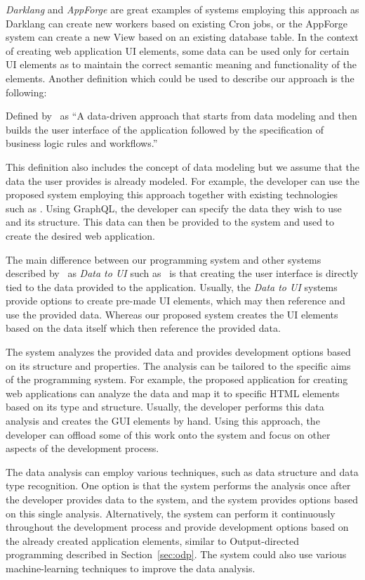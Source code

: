 \emph{Darklang} and \emph{AppForge} are great examples of systems employing this approach as Darklang can create new workers based on existing Cron jobs, or the AppForge system can create a new View based on an existing database table.
In the context of creating web application UI elements, some data can be used only for certain UI elements as to maintain the correct semantic meaning and functionality of the elements.
Another definition which could be used to describe our approach is the following:

\begin{defn}[Data to UI]
	Defined by~\citet{Sahay_Indamutsa_Di} as ``A data-driven approach that starts from data modeling and then builds the user interface of the application followed by the specification of business logic rules and workflows.''
\end{defn}

This definition also includes the concept of data modeling but we assume that the data the user provides is already modeled.
For example, the developer can use the proposed system employing this approach together with existing technologies such as \citet{graphql}.
Using GraphQL, the developer can specify the data they wish to use and its structure.
This data can then be provided to the system and used to create the desired web application.

The main difference between our programming system and other systems described by~\citet{Sahay_Indamutsa_Di} as \emph{Data to UI} such as~\citet{mendix} is that creating the user interface is directly tied to the data provided to the application.
Usually, the \emph{Data to UI} systems provide options to create pre-made UI elements, which may then reference and use the provided data.
Whereas our proposed system creates the UI elements based on the data itself which then reference the provided data.

The system analyzes the provided data and provides development options based on its structure and properties.
The analysis can be tailored to the specific aims of the programming system.
For example, the proposed application for creating web applications can analyze the data and map it to specific HTML elements based on its type and structure.
Usually, the developer performs this data analysis and creates the GUI elements by hand.
Using this approach, the developer can offload some of this work onto the system and focus on other aspects of the development process.

The data analysis can employ various techniques, such as data structure and data type recognition.
One option is that the system performs the analysis once after the developer provides data to the system, and the system provides options based on this single analysis.
Alternatively, the system can perform it continuously throughout the development process and provide development options based on the already created application elements, similar to Output-directed programming described in Section~\ref{sec:odp}.
The system could also use various machine-learning techniques to improve the data analysis.


